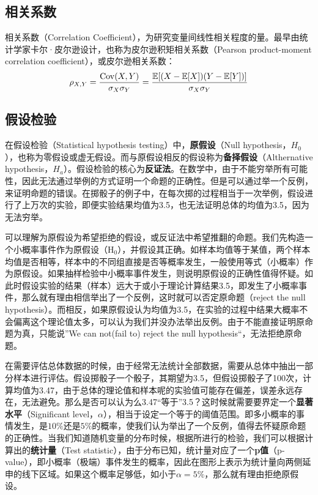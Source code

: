 \documentclass[11pt]{article}
\begin{document}
\subsection{相关系数}

相关系数（Correlation Coefficient），为研究变量间线性相关程度的量。最早由统计学家卡尔·皮尔逊设计，也称为皮尔逊积矩相关系数（Pearson product-moment correlation coefficient），或皮尔逊相关系数：
\begin{equation*}
    \rho_{X,Y} = \frac{\operatorname{Cov}(X,Y)}{\sigma_X\sigma_Y}
    = \frac{\mathbb{E}[(X-\mathbb{E}[X])(Y-\mathbb{E}[Y])]}{\sigma_X\sigma_Y}
\end{equation*}

\subsection{假设检验}

在假设检验（Statistical hypothesis testing）中，\textbf{原假设}（Null hypothesis，$H_0$），也称为零假设或虚无假设。而与原假设相反的假设称为\textbf{备择假设}（Althernative hypothesis，$H_a$）。假设检验的核心为\textbf{反证法}。在数学中，由于不能穷举所有可能性，因此无法通过举例的方式证明一个命题的正确性。但是可以通过举一个反例，来证明命题的错误。在掷骰子的例子中，在每次掷的过程相当于一次举例，假设进行了上万次的实验，即便实验结果均值为3.5，也无法证明总体的均值为3.5，因为无法穷举。

可以理解为原假设为希望拒绝的假设，或反证法中希望推翻的命题。我们先构造一个小概率事件作为原假设（$\text{H}_0$），并假设其正确。如样本均值等于某值，两个样本均值是否相等，样本中的不同组直接是否等概率发生，一般使用等式（小概率）作为原假设。如果抽样检验中小概率事件发生，则说明原假设的正确性值得怀疑。如此时假设实验的结果（样本）远大于或小于理论计算结果3.5，即发生了小概率事件，那么就有理由相信举出了一个反例，这时就可以否定原命题（reject the null hypothesis）。而相反，如果原假设认为均值为3.5，在实验的过程中结果大概率不会偏离这个理论值太多，可以认为我们并没办法举出反例。由于不能直接证明原命题为真，只能说”We can not(fail to) reject the null hypothesis“，无法拒绝原命题。

在需要评估总体数据的时候，由于经常无法统计全部数据，需要从总体中抽出一部分样本进行评估。假设掷骰子一个骰子，其期望为3.5，但假设掷骰子了100次，计算均值为3.47，由于总体的理论值和样本呢的实验值可能存在偏差，误差永远存在，无法避免。那么是否可以认为么3.47“等于”3.5？这时候就需要要界定一个\textbf{显著水平}（Significant level，$\alpha$），相当于设定一个等于的阈值范围。即多小概率的事情发生，是$10\%$还是$5\%$的概率，使我们认为举出了一个反例，值得去怀疑原命题的正确性。当我们知道随机变量的分布时候，根据所进行的检验，我们可以根据计算出的\textbf{统计量}（Test statistic），由于分布已知，统计量对应了一个\textbf{p值}（p-value），即小概率（极端）事件发生的概率，因此在图形上表示为统计量向两侧延申的线下区域。如果这个概率足够低，如小于$\alpha=5\%$，那么就有理由拒绝原假设。
\end{document}
